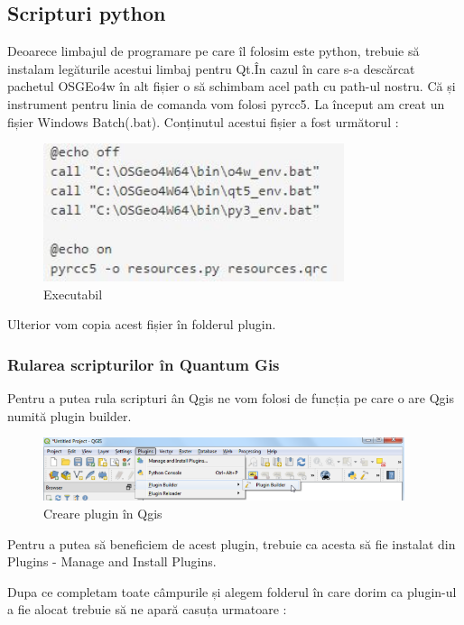 \documentclass[12pt,a4paper]{article}
\theoremstyle{definition}
\theoremstyle{remark}
\begin{document}
\subsection{Scripturi python}
Deoarece limbajul de programare pe care îl folosim este python, trebuie să instalam legăturile acestui limbaj pentru Qt.În cazul în care s-a descărcat pachetul OSGEo4w în alt fișier o să schimbam acel path cu path-ul nostru. Că și instrument pentru linia de comanda vom folosi pyrcc5. La început am creat un fișier Windows Batch(.bat). Conținutul acestui fișier a fost următorul \cite{script} :



\begin{figure}[H]
  \centering
  \includegraphics[width=250pt]{Capture.JPG}
  \caption{Executabil \cite{script}}   
\end{figure}

Ulterior vom copia acest fișier în folderul plugin.

\subsubsection{Rularea scripturilor în Quantum Gis}

Pentru a putea rula scripturi ân Qgis ne vom folosi de funcția pe care o are Qgis numită plugin builder.


\begin{figure}[H]
  \centering
  \includegraphics[width=300pt]{qgispluginPNG.PNG}
  \caption{Creare plugin  în Qgis \cite{script}}   
\end{figure}

Pentru a putea să beneficiem de acest plugin, trebuie ca acesta să fie instalat din Plugins - Manage and Install Plugins.

Dupa ce completam toate câmpurile și alegem folderul în care dorim ca plugin-ul a fie alocat  trebuie să ne apară casuța urmatoare :
\end{document}

